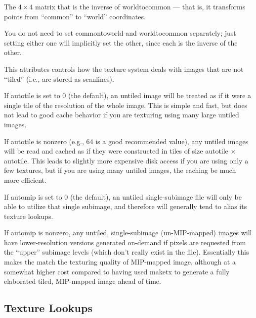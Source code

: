 The $4 \times 4$ matrix that is the inverse of {\cf worldtocommon} ---
that is, it transforms points from ``common'' to ``world'' coordinates.

You do not need to set {\cf commontoworld} and {\cf worldtocommon}
separately; just setting either one will implicitly set the other, since
each is the inverse of the other.
\apiend

This attributes controls how the texture system deals with images that
are not ``tiled'' (i.e., are stored as scanlines).

If {\cf autotile} is set to 0 (the default), an untiled image will be
treated as if it were a single tile of the resolution of the whole
image.  This is simple and fast, but does not lead to good cache 
behavior if you are texturing using many large untiled images.

If {\cf autotile} is nonzero (e.g., 64 is a good recommended value), any
untiled images will be read and cached as if they were constructed in
tiles of size {\cf autotile} $\times$ {\cf autotile}.  This leads to
slightly more expensive disk access if you are using only a few
textures, but if you are using many untiled images, the caching be much
more efficient.
\apiend

If {\cf automip} is set to 0 (the default), an untiled single-subimage
file will only be able to utilize that single subimage, and therefore
will generally tend to alias its texture lookups.

If {\cf automip} is nonzero, any untiled, single-subimage
(un-MIP-mapped) images will have lower-resolution versions generated
on-demand if pixels are requested from the ``upper'' subimage levels
(which don't really exist in the file).  Essentially this makes the
\TextureSystem match the texturing quality of MIP-mapped image, although
at a somewhat higher cost compared to having used {\cf maketx} to
generate a fully elaborated tiled, MIP-mapped image ahead of time.
\apiend


\newpage
\subsection{Texture Lookups}
\label{sec:texturesys:api:texture}


